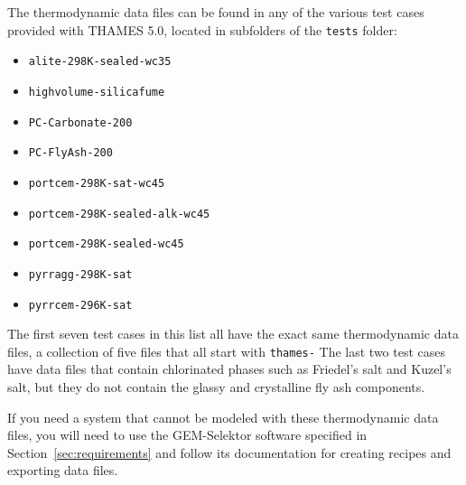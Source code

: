 \documentclass{article}
\begin{document}
The thermodynamic data files can be found in any of the various test cases
provided with THAMES 5.0, located in subfolders of the \verb!tests! folder:
\begin{itemize}
	\item \verb!alite-298K-sealed-wc35!
	\item \verb!highvolume-silicafume!
	\item \verb!PC-Carbonate-200!
	\item \verb!PC-FlyAsh-200!
	\item \verb!portcem-298K-sat-wc45!
	\item \verb!portcem-298K-sealed-alk-wc45!
	\item \verb!portcem-298K-sealed-wc45!
	\item \verb!pyrragg-298K-sat!
	\item \verb!pyrrcem-296K-sat!
\end{itemize}
The first seven test cases in this list all have the exact same thermodynamic
data files, a collection of five files that all start with \verb!thames-!
The last two test cases have data files that contain chlorinated phases such
as Friedel's salt and Kuzel's salt, but they do not contain the glassy and
crystalline fly ash components.

If you need a system that cannot be modeled with these thermodynamic
data files, you will need to use the GEM-Selektor software specified in
Section~\ref{sec:requirements} and follow its documentation for creating
recipes and exporting data files.

\normalsize{ }
\end{document}

